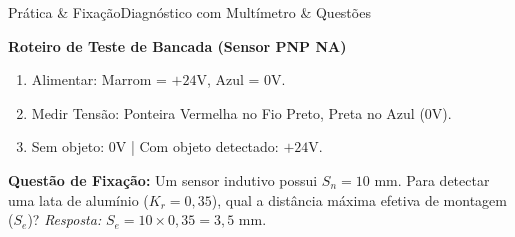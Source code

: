 \begin{senaiframe}{Prática & Fixação}{Diagnóstico com Multímetro \& Questões}
  \begin{block}{\textbf{Roteiro de Teste de Bancada (Sensor PNP NA)}}
    \begin{enumerate}
      \item Alimentar: Marrom = $+24\text{V}$, Azul = $0\text{V}$.
      \item Medir Tensão: Ponteira Vermelha no Fio Preto, Preta no Azul ($0\text{V}$).
      \item Sem objeto: $0\text{V}$ | Com objeto detectado: $+24\text{V}$.
    \end{enumerate}
  \end{block}

  \vspace{4pt}
  \small
  \textbf{Questão de Fixação:} Um sensor indutivo possui $S_n = 10\text{ mm}$. Para detectar uma lata de alumínio ($K_r = 0,35$), qual a distância máxima efetiva de montagem ($S_e$)?  
  \textit{Resposta:} $S_e = 10 \times 0,35 = 3,5\text{ mm}$.
\end{senaiframe}
